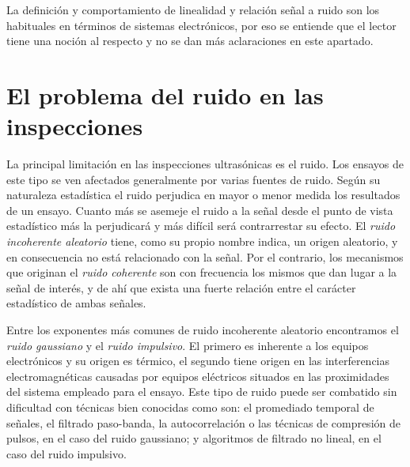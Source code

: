 La definición y comportamiento de linealidad y relación señal a ruido son
los habituales en términos de sistemas electrónicos, por eso se entiende
que el lector tiene una noción al respecto y no se dan más aclaraciones en
este apartado.


\section{El problema del ruido en las inspecciones}\label{sec:noise}

La principal limitación en las inspecciones ultrasónicas es el ruido. Los
ensayos de este tipo se ven afectados generalmente por varias fuentes de
ruido. Según su naturaleza estadística el ruido perjudica en mayor o menor
medida los resultados de un ensayo. Cuanto más se asemeje el ruido a la
señal desde el punto de vista estadístico más la perjudicará y más difícil
será contrarrestar su efecto. El \emph{ruido incoherente aleatorio} tiene,
como su propio nombre indica, un origen aleatorio, y en consecuencia no
está relacionado con la señal. Por el contrario, los mecanismos que
originan el \emph{ruido coherente} son con frecuencia los mismos que dan
lugar a la señal de interés, y de ahí que exista una fuerte relación entre
el carácter estadístico de ambas señales.

Entre los exponentes más comunes de ruido incoherente aleatorio encontramos
el \emph{ruido gaussiano} y el \emph{ruido impulsivo}. El primero es
inherente a los equipos electrónicos y su origen es térmico, el segundo
tiene origen en las interferencias electromagnéticas causadas por equipos
eléctricos situados en las proximidades del sistema empleado para el
ensayo. Este tipo de ruido puede ser combatido sin dificultad con técnicas
bien conocidas como son: el promediado temporal de señales, el filtrado
paso-banda, la autocorrelación o las técnicas de compresión de pulsos, en
el caso del ruido gaussiano; y algoritmos de filtrado no lineal, en el caso
del ruido impulsivo.

